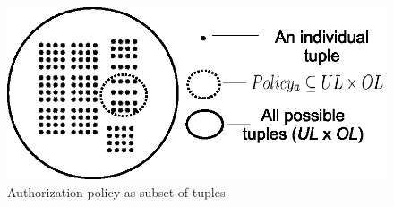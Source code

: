 
 	\begin{figure}
 		\centering
 		\includegraphics[width=.6\textwidth]{ABAC16/tuples-vs-policy}
 		\caption{Authorization policy as subset of tuples}
 		\label{fig:policy-vs-tuples}
 	\end{figure}